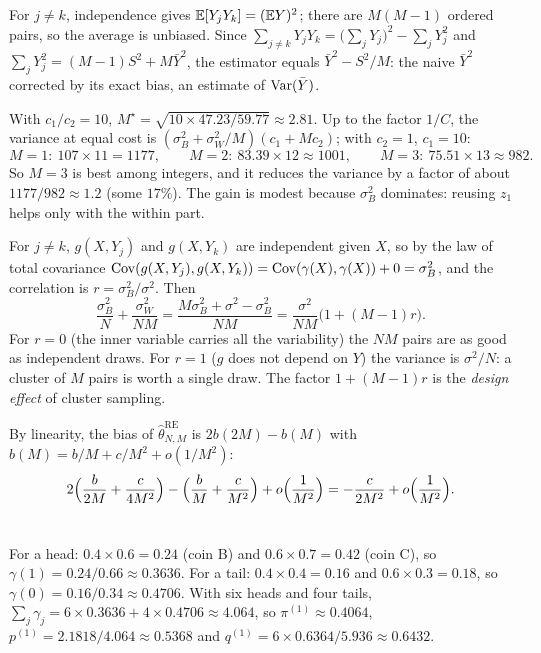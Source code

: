 For $j\neq k$, independence gives $\mathbb{E}[Y_jY_k] = (\mathbb{E} Y)^2$; there are $M(M-1)$ ordered
pairs, so the average is unbiased. Since
$\sum_{j\neq k}Y_jY_k = \bigl(\sum_jY_j\bigr)^2 - \sum_jY_j^2$ and
$\sum_jY_j^2 = (M-1)S^2 + M\bar Y^2$, the estimator equals $\bar Y^2 - S^2/M$: the
naive $\bar Y^2$ corrected by its exact bias, an estimate of $\operatorname{Var}(\bar Y)$.

With $c_1/c_2 = 10$, $M^\star = \sqrt{10\times47.23/59.77}\approx2.81$. Up to the factor
$1/C$, the variance at equal cost is $(\sigma_B^2 + \sigma_W^2/M)(c_1 + Mc_2)$; with
$c_2 = 1$, $c_1 = 10$:
\[
  M = 1:\ 107\times11 = 1177,\qquad M = 2:\ 83.39\times12\approx1001,\qquad
  M = 3:\ 75.51\times13\approx982 .
\]
So $M = 3$ is best among integers, and it reduces the variance by a factor of about
$1177/982\approx1.2$ (some $17\%$). The gain is modest because $\sigma_B^2$ dominates:
reusing $z_1$ helps only with the within part.

For $j\neq k$, $g(X,Y_j)$ and $g(X,Y_k)$ are independent given $X$, so by the law of
total covariance $\operatorname{Cov}(g(X,Y_j),g(X,Y_k)) = \operatorname{Cov}(\gamma(X),\gamma(X)) + 0 = \sigma_B^2$, and the
correlation is $r = \sigma_B^2/\sigma^2$. Then
\[
  \frac{\sigma_B^2}N + \frac{\sigma_W^2}{NM} = \frac{M\sigma_B^2 + \sigma^2 - \sigma_B^2}{NM}
  = \frac{\sigma^2}{NM}\bigl(1 + (M-1)r\bigr).
\]
For $r = 0$ (the inner variable carries all the variability) the $NM$ pairs are as
good as independent draws. For $r = 1$ ($g$ does not depend on $Y$) the variance is
$\sigma^2/N$: a cluster of $M$ pairs is worth a single draw. The factor $1 + (M-1)r$ is
the \emph{design effect} of cluster sampling.

By linearity, the bias of $\hat\theta^{\mathrm{RE}}_{N,M}$ is $2b(2M) - b(M)$ with
$b(M) = b/M + c/M^2 + o(1/M^2)$:
\[
  2\Bigl(\frac b{2M} + \frac c{4M^2}\Bigr) - \Bigl(\frac bM + \frac c{M^2}\Bigr) + o\Bigl(\frac1{M^2}\Bigr)
  = -\frac c{2M^2} + o\Bigl(\frac1{M^2}\Bigr).
\]

\section{}

For a head: $0.4\times0.6 = 0.24$ (coin B) and $0.6\times0.7 = 0.42$ (coin C), so
$\gamma(1) = 0.24/0.66\approx0.3636$. For a tail: $0.4\times0.4 = 0.16$ and
$0.6\times0.3 = 0.18$, so $\gamma(0) = 0.16/0.34\approx0.4706$. With six heads and four
tails, $\sum_j\gamma_j = 6\times0.3636 + 4\times0.4706\approx4.064$, so $\pi^{(1)}\approx0.4064$,
$p^{(1)} = 2.1818/4.064\approx0.5368$ and $q^{(1)} = 6\times0.6364/5.936\approx0.6432$.

